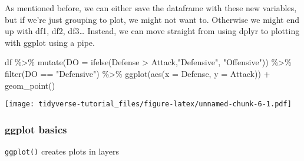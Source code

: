 \documentclass[
]{article}
\newenvironment{Shaded}{\begin{snugshade}}{\end{snugshade}}
\newcommand{\AttributeTok}[1]{\textcolor[rgb]{0.77,0.63,0.00}{#1}}
\newcommand{\FunctionTok}[1]{\textcolor[rgb]{0.00,0.00,0.00}{#1}}
\newcommand{\NormalTok}[1]{#1}
\newcommand{\SpecialCharTok}[1]{\textcolor[rgb]{0.00,0.00,0.00}{#1}}
\newcommand{\StringTok}[1]{\textcolor[rgb]{0.31,0.60,0.02}{#1}}
\begin{document}
As mentioned before, we can either save the dataframe with these new
variables, but if we're just grouping to plot, we might not want to.
Otherwise we might end up with df1, df2, df3\ldots{} Instead, we can
move straight from using dplyr to plotting with ggplot using a pipe.

\begin{Shaded}
\begin{Highlighting}[]
\NormalTok{df }\SpecialCharTok{\%\textgreater{}\%} 
  \FunctionTok{mutate}\NormalTok{(}\AttributeTok{DO =} \FunctionTok{ifelse}\NormalTok{(Defense }\SpecialCharTok{\textgreater{}}\NormalTok{ Attack,}\StringTok{"Defensive"}\NormalTok{, }\StringTok{"Offensive"}\NormalTok{)) }\SpecialCharTok{\%\textgreater{}\%}
  \FunctionTok{filter}\NormalTok{(DO }\SpecialCharTok{==} \StringTok{"Defensive"}\NormalTok{) }\SpecialCharTok{\%\textgreater{}\%}
  \FunctionTok{ggplot}\NormalTok{(}\FunctionTok{aes}\NormalTok{(}\AttributeTok{x =}\NormalTok{ Defense, }\AttributeTok{y =}\NormalTok{ Attack)) }\SpecialCharTok{+}
  \FunctionTok{geom\_point}\NormalTok{()}
\end{Highlighting}
\end{Shaded}

\texttt{[image: tidyverse-tutorial\_files/figure-latex/unnamed-chunk-6-1.pdf]}

\hypertarget{ggplot-basics}{%
\subsubsection{ggplot basics}\label{ggplot-basics}}

\texttt{ggplot()} creates plots in layers
\end{document}
